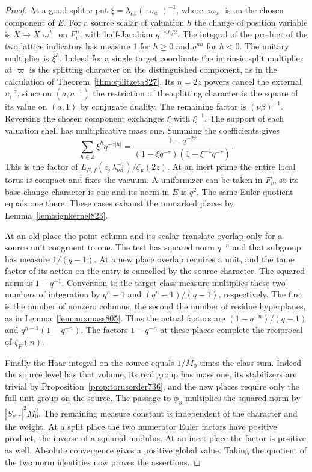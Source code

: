 \documentclass[a4paper,11pt]{article}
\theoremstyle{definition}
\theoremstyle{remark}
\numberwithin{equation}{section}
\begin{document}
\begin{proof}
At a good split \(v\) put \(\xi=\lambda_{\nu\beta}
(\varpi_w)^{-1}\), where \(\varpi_w\) is on the chosen
component of \(E\). For a source scalar of valuation \(h\)
the change of position variable is \(X\mapsto X\varpi^h\)
on \(F_v^n\), with half-Jacobian \(q^{-nh/2}\).
The integral of the product of the two lattice indicators
has measure \(1\) for \(h\ge0\) and \(q^{nh}\) for \(h<0\).
The unitary multiplier is \(\xi^h\). Indeed for a single
target coordinate the intrinsic split multiplier at
\(\varpi\) is the splitting character on the distinguished
component, as in the calculation of
Theorem~\ref{thm:splitzeta827}. Its \(n=2z\) powers cancel
the external \(\upsilon_1^{-z}\), since on
\((a,a^{-1})\) the restriction of the splitting character
is the square of its value on \((a,1)\) by conjugate duality.
The remaining factor is \((\nu\beta)^{-1}\). Reversing the
chosen component exchanges \(\xi\) with \(\xi^{-1}\).
The support of each valuation shell has multiplicative mass
one. Summing the coefficients gives
\[
      \sum_{h\in\mathbb Z}\xi^h q^{-z|h|}
          =\frac{1-q^{-2z}}{(1-\xi q^{-z})(1-\xi^{-1}q^{-z})}.
\]
This is the factor of \(L_{E,f}(z,\lambda_{\nu\beta}^{-1})
/\zeta_F(2z)\). At an inert prime the entire local torus is
compact and fixes the vacuum. A uniformizer can be taken in
\(F_v\), so its base-change character is one and its norm
in \(E\) is \(q^2\). The same Euler quotient equals one there.
These cases exhaust the unmarked places by
Lemma~\ref{lem:signkernel823}.

At an old place the point column and its scalar translate
overlap only for a source unit congruent to one. The test
has squared norm \(q^{-n}\) and that subgroup has measure
\(1/(q-1)\). At a new place overlap requires a unit, and the
tame factor of its action on the entry is cancelled by the
source character. The squared norm is \(1-q^{-1}\).
Conversion to the target class measure multiplies these two
numbers of integration by \(q^n-1\) and
\((q^n-1)/(q-1)\), respectively. The first is the number of
nonzero columns, the second the number of residue hyperplanes,
as in Lemma~\ref{lem:auxmass805}. Thus the actual factors are
\((1-q^{-n})/(q-1)\) and \(q^{n-1}(1-q^{-n})\).
The factors \(1-q^{-n}\) at these places complete the
reciprocal of \(\zeta_F(n)\).

Finally the Haar integral on the source equals \(1/M_0\)
times the class sum. Indeed the source level has that
volume, its real group has mass one, its stabilizers are
trivial by Proposition~\ref{prop:torusorder736}, and the new
places require only the full unit group on the source. The
passage to \(\phi_\beta\) multiplies the squared norm by
\(|S_{\nu,z}|^2M_0^2\). The remaining measure constant is
independent of the character and the weight. At a split place
the two numerator Euler factors have positive product, the
inverse of a squared modulus. At an inert place the factor
is positive as well. Absolute convergence gives a positive
global value. Taking the quotient of the two norm identities
now proves the assertions.
\end{proof}
\end{document}
